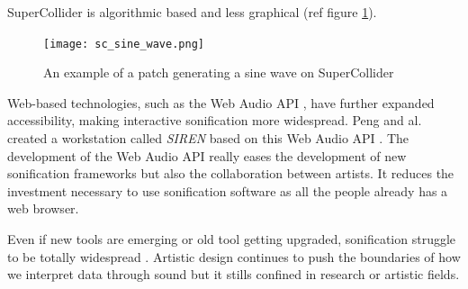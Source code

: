 SuperCollider is algorithmic based and less graphical (ref figure \ref{fig:sc_sine_wave}).

\begin{figure}[h]
    \centering
    \texttt{[image: sc\_sine\_wave.png]}
    \caption{An example of a patch generating a sine wave on SuperCollider} 
    \vspace{0.1cm}
    \label{fig:sc_sine_wave}
\end{figure}



Web-based technologies, such as the Web Audio API \cite{smus2013web}, have further expanded accessibility, making interactive sonification more widespread. Peng and al. created a workstation called \textit{SIREN} based on this Web Audio API \cite{pengSIRENCaseStudy2021}. The development of the Web Audio API really eases the development of new sonification frameworks but also the collaboration between artists. It reduces the investment necessary to use sonification software as all the people already has a web browser.

Even if new tools are emerging or old tool getting upgraded, sonification struggle to be totally widespread \cite{neuhoffSonificationDoomedFail2019}. Artistic design continues to push the boundaries of how we interpret data through sound but it stills confined in research or artistic fields.